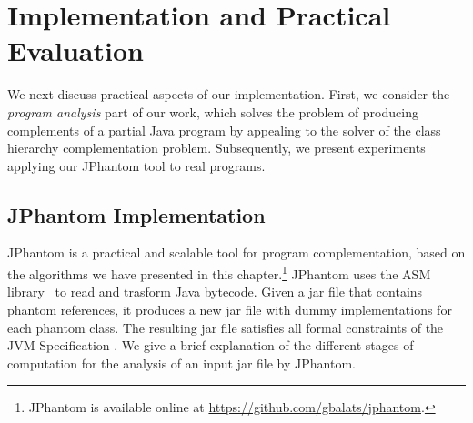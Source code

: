 \section{Implementation and Practical Evaluation}
\label{hiercomp/sect/jphantom}

We next discuss practical aspects of our implementation. First, we
consider the \emph{program analysis} part of our work, which solves
the problem of producing complements of a partial Java program by
appealing to the solver of the class hierarchy complementation
problem. Subsequently, we present experiments applying our JPhantom
tool to real programs.

\subsection{JPhantom Implementation}

JPhantom is a practical and scalable tool for program complementation,
based on the algorithms we have presented in this
chapter.\footnote{JPhantom is available online at
  \url{https://github.com/gbalats/jphantom}.} JPhantom uses the ASM
library~\cite{Bruneton2002asm} to read and trasform Java
bytecode. Given a jar file that contains phantom references, it
produces a new jar file with dummy implementations for each phantom
class. The resulting jar file satisfies all formal constraints of the
JVM Specification \cite{Lindholm:1999:JVM:553607}. We give a brief
explanation of the different stages of computation for the analysis of
an input jar file by JPhantom.



